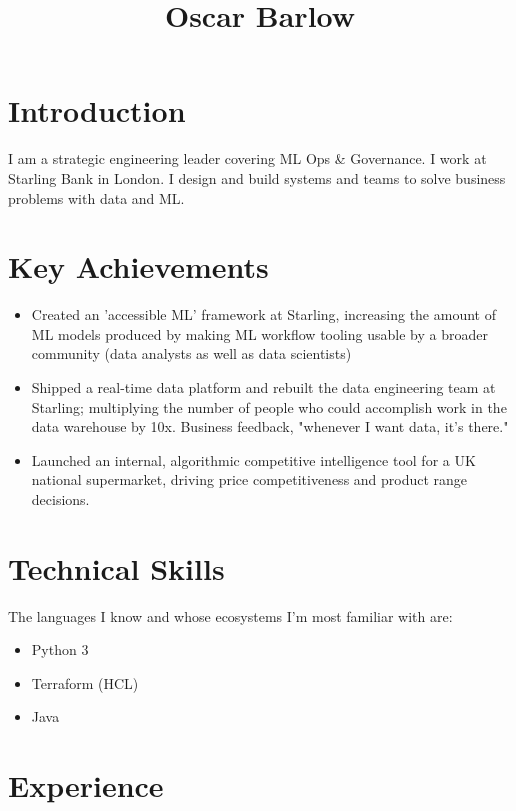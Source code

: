 \documentclass[a4paper,10pt]{article}
\date{}
\begin{document}
\title{Oscar Barlow}
\maketitle

\section*{Introduction}
I am a strategic engineering leader covering ML Ops \& Governance. I work at
Starling Bank in London. I design and build systems and teams to solve business
problems with data and ML.

\section*{Key Achievements}
\begin{itemize}
      \item Created an 'accessible ML' framework at Starling, increasing the
            amount of ML models produced by making ML workflow tooling usable by
            a broader community (data analysts as well as data scientists)
      \item Shipped a real-time data platform and rebuilt the data engineering
            team at Starling; multiplying the number of people who could accomplish work in
            the data warehouse by 10x. Business feedback, "whenever I want data, it's
            there."
      \item Launched an internal, algorithmic competitive intelligence tool for
            a UK national supermarket, driving price competitiveness and product
            range decisions.
\end{itemize}

\section*{Technical Skills}
The languages I know and whose ecosystems I'm most familiar with are:
\begin{itemize}
      \item Python 3
      \item Terraform (HCL)
      \item Java
\end{itemize}

\section*{Experience}
\end{document}
